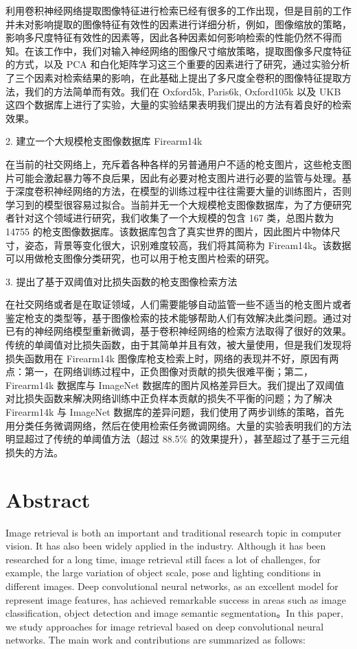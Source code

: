 利用卷积神经网络提取图像特征进行检索已经有很多的工作出现，但是目前的工作并未对影响提取的图像特征有效性的因素进行详细分析，例如，图像缩放的策略，影响多尺度特征有效性的因素等，因此各种因素如何影响检索的性能仍然不得而知。在该工作中，我们对输入神经网络的图像尺寸缩放策略，提取图像多尺度特征的方式，以及 PCA 和白化矩阵学习这三个重要的因素进行了研究，通过实验分析了三个因素对检索结果的影响，在此基础上提出了多尺度全卷积的图像特征提取方法，我们的方法简单而有效。我们在 Oxford5k, Paris6k, Oxford105k 以及 UKB 这四个数据库上进行了实验，大量的实验结果表明我们提出的方法有着良好的检索效果。


2. 建立一个大规模枪支图像数据库 Firearm14k

在当前的社交网络上，充斥着各种各样的另普通用户不适的枪支图片，这些枪支图片可能会激起暴力等不良后果，因此有必要对枪支图片进行必要的监管与处理。基于深度卷积神经网络的方法，在模型的训练过程中往往需要大量的训练图片，否则学习到的模型很容易过拟合。当前并无一个大规模枪支图像数据库，为了方便研究者针对这个领域进行研究，我们收集了一个大规模的包含 167 类，总图片数为 14755 的枪支图像数据库。该数据库包含了真实世界的图片，因此图片中物体尺寸，姿态，背景等变化很大，识别难度较高，我们将其简称为 Fiream14k。该数据可以用做枪支图像分类研究，也可以用于枪支图片检索的研究。

3. 提出了基于双阈值对比损失函数的枪支图像检索方法

在社交网络或者是在取证领域，人们需要能够自动监管一些不适当的枪支图片或者鉴定枪支的类型等，基于图像检索的技术能够帮助人们有效解决此类问题。通过对已有的神经网络模型重新微调，基于卷积神经网络的检索方法取得了很好的效果。传统的单阈值对比损失函数，由于其简单并且有效，被大量使用，但是我们发现将损失函数用在 Firearm14k 图像库枪支检索上时，网络的表现并不好，原因有两点：第一，在网络训练过程中，正负图像对贡献的损失很难平衡；第二，Firearm14k 数据库与 ImageNet 数据库的图片风格差异巨大。我们提出了双阈值对比损失函数来解决网络训练中正负样本贡献的损失不平衡的问题；为了解决 Firearm14k 与 ImageNet 数据库的差异问题，我们使用了两步训练的策略，首先用分类任务微调网络，然后在使用检索任务微调网络。大量的实验表明我们的方法明显超过了传统的单阈值方法（超过 88.5\% 的效果提升），甚至超过了基于三元组损失的方法。


\chapter{Abstract}
Image retrieval is both an important and traditional research topic in computer vision. It has also been widely applied in the industry. Although it has been researched for a long time, image retrieval still faces a lot of challenges, for example, the large variation of object scale, pose and lighting conditions in different images. Deep convolutional neural networks, as an excellent model for represent image features, has achieved remarkable success in areas such as image classification, object detection and image semantic segmentation。In this paper, we study approaches for image retrieval based on deep convolutional neural networks. The main work and contributions are summarized as follows:

